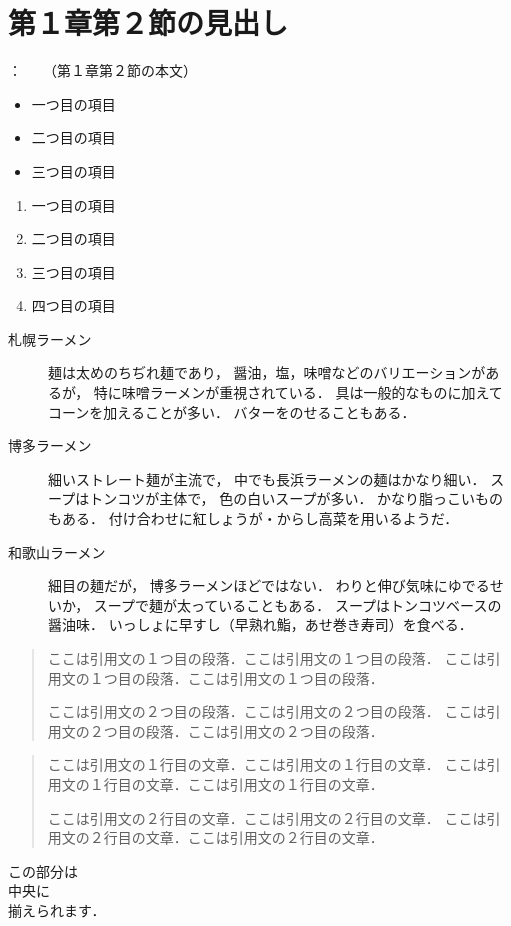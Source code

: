 \documentclass[11pt,a4paper]{jreport}
\begin{document}
\section{第１章第２節の見出し}
   ：　　（第１章第２節の本文）
   \begin{itemize}
    \item 一つ目の項目
    \item 二つ目の項目
    \item 三つ目の項目
   \end{itemize}
\begin{enumerate}
\item 一つ目の項目
\item 二つ目の項目
\item 三つ目の項目
\item 四つ目の項目
\end{enumerate}
\begin{description}
\item[札幌ラーメン] 麺は太めのちぢれ麺であり，
    醤油，塩，味噌などのバリエーションがあるが，
    特に味噌ラーメンが重視されている．
    具は一般的なものに加えてコーンを加えることが多い．
    バターをのせることもある．
\item[博多ラーメン] 細いストレート麺が主流で，
    中でも長浜ラーメンの麺はかなり細い．
    スープはトンコツが主体で，
    色の白いスープが多い．
    かなり脂っこいものもある．
    付け合わせに紅しょうが・からし高菜を用いるようだ．
\item[和歌山ラーメン] 細目の麺だが，
    博多ラーメンほどではない．
    わりと伸び気味にゆでるせいか，
    スープで麺が太っていることもある．
    スープはトンコツベースの醤油味．
    いっしょに早すし（早熟れ鮨，あせ巻き寿司）を食べる．
\end{description}
\begin{quotation}
ここは引用文の１つ目の段落．ここは引用文の１つ目の段落．
ここは引用文の１つ目の段落．ここは引用文の１つ目の段落．

ここは引用文の２つ目の段落．ここは引用文の２つ目の段落．
ここは引用文の２つ目の段落．ここは引用文の２つ目の段落．
\end{quotation}
\begin{quote}
ここは引用文の１行目の文章．ここは引用文の１行目の文章．
ここは引用文の１行目の文章．ここは引用文の１行目の文章．

ここは引用文の２行目の文章．ここは引用文の２行目の文章．
ここは引用文の２行目の文章．ここは引用文の２行目の文章．
\end{quote}
\begin{center}
この部分は \\
中央に \\
揃えられます．
\end{center}
\end{document}
